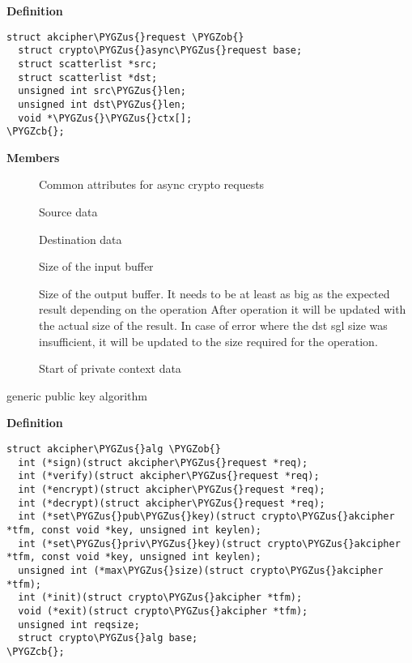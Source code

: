 \documentclass[a4paper,8pt,english]{sphinxmanual}
\def\PYGZus{\char`\_}
\def\PYGZob{\char`\{}
\def\PYGZcb{\char`\}}
\begin{document}
\textbf{Definition}

\begin{Verbatim}[commandchars=\\\{\}]
struct akcipher\PYGZus{}request \PYGZob{}
  struct crypto\PYGZus{}async\PYGZus{}request base;
  struct scatterlist *src;
  struct scatterlist *dst;
  unsigned int src\PYGZus{}len;
  unsigned int dst\PYGZus{}len;
  void *\PYGZus{}\PYGZus{}ctx[];
\PYGZcb{};
\end{Verbatim}

\textbf{Members}
\begin{description}
\item[{}] \leavevmode
Common attributes for async crypto requests

\item[{}] \leavevmode
Source data

\item[{}] \leavevmode
Destination data

\item[{}] \leavevmode
Size of the input buffer

\item[{}] \leavevmode
Size of the output buffer. It needs to be at least
as big as the expected result depending on the operation
After operation it will be updated with the actual size of the
result.
In case of error where the dst sgl size was insufficient,
it will be updated to the size required for the operation.

\item[{}] \leavevmode
Start of private context data

\end{description}

\begin{fulllineitems}
\label{crypto/api-akcipher:c.akcipher_alg}
generic public key algorithm

\end{fulllineitems}


\textbf{Definition}

\begin{Verbatim}[commandchars=\\\{\}]
struct akcipher\PYGZus{}alg \PYGZob{}
  int (*sign)(struct akcipher\PYGZus{}request *req);
  int (*verify)(struct akcipher\PYGZus{}request *req);
  int (*encrypt)(struct akcipher\PYGZus{}request *req);
  int (*decrypt)(struct akcipher\PYGZus{}request *req);
  int (*set\PYGZus{}pub\PYGZus{}key)(struct crypto\PYGZus{}akcipher *tfm, const void *key, unsigned int keylen);
  int (*set\PYGZus{}priv\PYGZus{}key)(struct crypto\PYGZus{}akcipher *tfm, const void *key, unsigned int keylen);
  unsigned int (*max\PYGZus{}size)(struct crypto\PYGZus{}akcipher *tfm);
  int (*init)(struct crypto\PYGZus{}akcipher *tfm);
  void (*exit)(struct crypto\PYGZus{}akcipher *tfm);
  unsigned int reqsize;
  struct crypto\PYGZus{}alg base;
\PYGZcb{};
\end{Verbatim}
\end{document}
